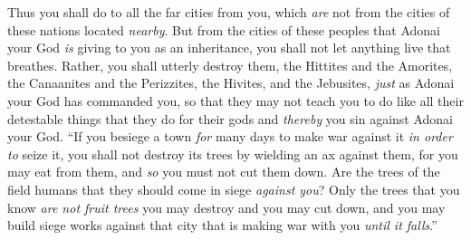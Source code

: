 \begin{biblechapter}
\verse Thus you shall do to all the far cities from you, which \textit{are} not from the cities of these nations located \textit{nearby}.
\verse But from the cities of these peoples that Adonai your God \textit{is} giving to you as an inheritance, you shall not let anything live that breathes.
\verse Rather, you shall utterly destroy them, the Hittites and the Amorites, the Canaanites and the Perizzites, the Hivites, and the Jebusites, \textit{just} as Adonai your God has commanded you,
\verse so that they may not teach you to do like all their detestable things that they do for their gods and \textit{thereby} you sin against Adonai your God.
\verse “If you besiege a town \textit{for} many days to make war against it \textit{in order to} seize it, you shall not destroy its trees by wielding an ax against them, for you may eat from them, and \textit{so} you must not cut them down. Are the trees of the field humans that they should come in siege \textit{against you}?
\verse Only the trees that you know \textit{are not fruit trees} you may destroy and you may cut down, and you may build siege works against that city that is making war with you \textit{until it falls}.”
\end{biblechapter}

